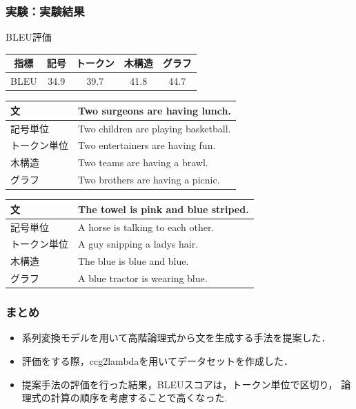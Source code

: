\documentclass[dvipdfmx]{beamer}
\begin{document}
\begin{frame}
\frametitle{実験：実験結果}
\begin{block}{BLEU評価}
  \label{table:evaluation}
  \centering
  \begin{tabular}{ccccc}
    \hline
    指標  & 記号 & トークン & 木構造 & グラフ \\
    \hline \hline
    BLEU  & 34.9   & 39.7 & 41.8  & 44.7\\
    \hline
  \end{tabular}
\label{sec:result}
\end{block}
\begin{table}[h]
\centering
\begin{tabular}{ll} \hline
文 & Two surgeons are having lunch. \\ \hline
記号単位 & Two children are playing basketball.\\
トークン単位 & Two entertainers are having fun.\\
木構造 & Two teams are having a brawl.\\
グラフ & Two brothers are having a picnic.\\ \hline
\end{tabular}
\label{tab:example1}
\end{table}
\begin{table}[h]
\centering
\begin{tabular}{ll} \hline
文 & The towel is pink and blue striped. \\ \hline
記号単位 & A horse is talking to each other.\\
トークン単位 & A guy snipping a ladys hair.\\
木構造 & The blue is blue and blue.\\
グラフ & A blue tractor is wearing blue.\\ \hline
\end{tabular}
\label{tab:example2}
\end{table}
\end{frame}

\begin{frame}
\frametitle{まとめ}
\begin{itemize}
\item 系列変換モデルを用いて高階論理式から文を生成する手法を提案した．
\item 評価をする際，ccg2lambdaを用いてデータセットを作成した．
\item 提案手法の評価を行った結果，BLEUスコアは，トークン単位で区切り，
論理式の計算の順序を考慮することで高くなった.
\end{itemize}

\end{frame}
\end{document}
